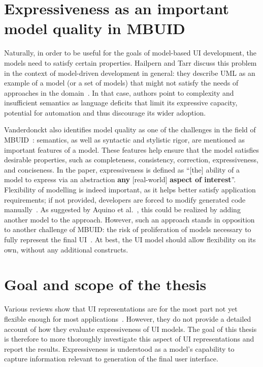 \section{Expressiveness as an important model quality in MBUID}\label{sec:model-quality-in-mbuid}
Naturally, in order to be useful for the goals of model-based UI development, the models need to satisfy certain properties.
Hailpern and Tarr discuss this problem in the context of model-driven development in general: they describe UML as an example of a model (or a set of models) that might not satisfy the needs of approaches in the domain~\cite{Hailpern2006}.
In that case, authors point to complexity and insufficient semantics as language deficits that limit its expressive capacity, potential for automation and thus discourage its wider adoption.

Vanderdonckt also identifies model quality as one of the challenges in the field of MBUID~\cite{Vanderdonckt2008}: semantics, as well as syntactic and stylistic rigor, are mentioned as important features of a model.
These features help ensure that the model satisfies desirable properties, such as completeness, consistency, correction, expressiveness, and conciseness.
In the paper, expressiveness is defined as \enquote{[the] ability of a model to express via an abstraction \textbf{any} [real-world] \textbf{aspect of interest}}.
Flexibility of modelling is indeed important, as it helps better satisfy application requirements;
if not provided, developers are forced to modify generated code manually~\cite{Pederiva2007}.
As suggested by Aquino et al.~\cite{Aquino2010}, this could be realized by adding another model to the approach.
However, such an approach stands in opposition to another challenge of MBUID: the risk of proliferation of models necessary to fully represent the final UI~\cite{Vanderdonckt2008}.
At best, the UI model should allow flexibility on its own, without any additional constructs.

\section{Goal and scope of the thesis}\label{sec:goal-and-scope}

Various reviews show that UI representations are for the most part not yet flexible enough for most applications~\cite{Ruiz2018, Souchon2003}.
However, they do not provide a detailed account of how they evaluate expressiveness of UI models.
The goal of this thesis is therefore to more thoroughly investigate this aspect of UI representations and report the results.
Expressiveness is understood as a model's capability to capture information relevant to generation of the final user interface.

